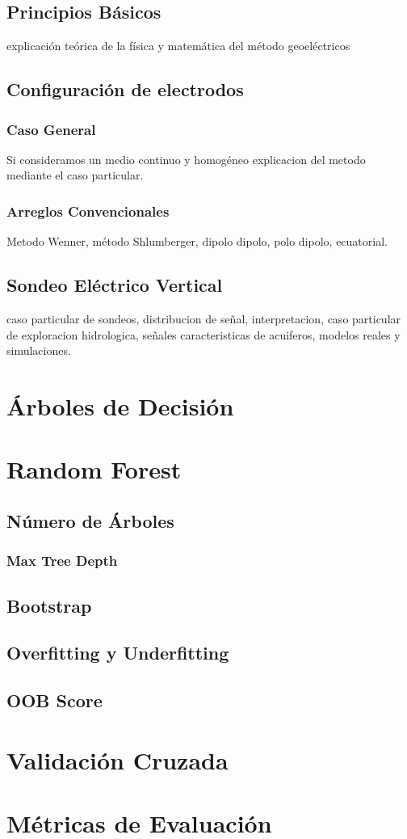 		
		\subsection{Principios Básicos}
		
			explicación teórica de la física y matemática del método geoeléctricos
			
		\subsection{Configuración de electrodos}
			\subsubsection{Caso General}
				Si consideramos un medio continuo y homogéneo explicacion del metodo mediante el caso particular.\\
				  
			\subsubsection{Arreglos Convencionales}
				Metodo Wenner, método Shlumberger, dipolo dipolo, polo dipolo, ecuatorial.\\
				
		\subsection{Sondeo Eléctrico Vertical}
		caso particular de sondeos, distribucion de señal, interpretacion, caso particular de exploracion hidrologica, señales caracteristicas de acuiferos, modelos reales y simulaciones.\\
		
	\section{Árboles de Decisión}
	\section{Random Forest}
		\subsection{Número de Árboles}
			\subsubsection{Max Tree Depth}
		\subsection{Bootstrap}
		\subsection{Overfitting y Underfitting}
		\subsection{OOB Score}
		\section{Validación Cruzada}
		\section{Métricas de Evaluación}
		
			
		